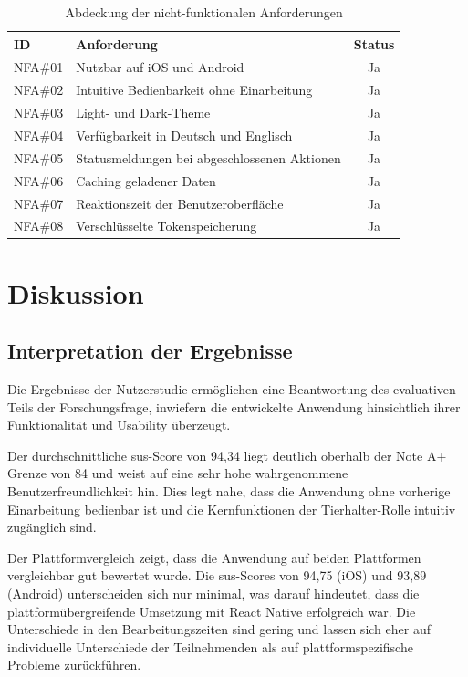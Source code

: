 \begin{table}[H]
\centering
\begin{tabular}{|l|p{7cm}|c|}
\hline
\textbf{ID} & \textbf{Anforderung} & \textbf{Status} \\
\hline
NFA\#01 & Nutzbar auf iOS und Android & Ja \\
NFA\#02 & Intuitive Bedienbarkeit ohne Einarbeitung & Ja \\
NFA\#03 & Light- und Dark-Theme & Ja \\
NFA\#04 & Verfügbarkeit in Deutsch und Englisch & Ja \\
NFA\#05 & Statusmeldungen bei abgeschlossenen Aktionen & Ja \\
NFA\#06 & Caching geladener Daten & Ja \\
NFA\#07 & Reaktionszeit der Benutzeroberfläche & Ja \\
NFA\#08 & Verschlüsselte Tokenspeicherung & Ja \\
\hline
\end{tabular}
\caption{Abdeckung der nicht-funktionalen Anforderungen}
\label{tab:nfa}
\end{table}

\section{Diskussion}
\subsection{Interpretation der Ergebnisse}
Die Ergebnisse der Nutzerstudie ermöglichen eine Beantwortung des evaluativen Teils der Forschungsfrage, inwiefern die entwickelte Anwendung hinsichtlich ihrer Funktionalität und Usability überzeugt.

Der durchschnittliche \gls{sus}-Score von 94,34 liegt deutlich oberhalb 
der Note A+ Grenze von 84 und weist auf eine sehr hohe wahrgenommene Benutzerfreundlichkeit hin. Dies legt nahe, dass die Anwendung ohne vorherige Einarbeitung bedienbar ist und die Kernfunktionen der Tierhalter-Rolle intuitiv zugänglich sind.

Der Plattformvergleich zeigt, dass die Anwendung auf beiden 
Plattformen vergleichbar gut bewertet wurde. Die \gls{sus}-Scores von 
94,75 (iOS) und 93,89 (Android) unterscheiden sich nur minimal, 
was darauf hindeutet, dass die plattformübergreifende Umsetzung 
mit React Native erfolgreich war. Die Unterschiede in den 
Bearbeitungszeiten sind gering und lassen sich eher auf individuelle Unterschiede der Teilnehmenden als auf plattformspezifische Probleme zurückführen.

